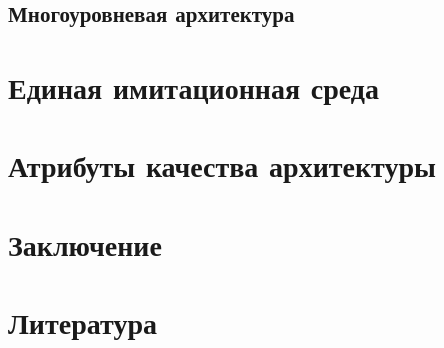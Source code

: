 \documentclass[paper=a4, fontsize=12pt, titlepage=false, twoside=false]{scrartcl}
\begin{document}
\subsection{Многоуровневая архитектура}

\section{Единая имитационная среда}

\section{Атрибуты качества архитектуры}

\section{Заключение}

\section{Литература}
\end{document}
